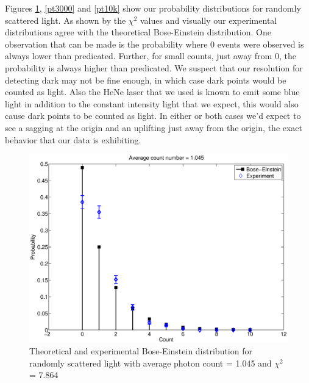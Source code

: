 Figures \ref{pt1000}, \ref{pt3000} and \ref{pt10k} show our probability distributions for randomly scattered light. As shown by the $\chi^{2}$ values and visually our experimental distributions agree with the theoretical Bose-Einstein distribution. One observation that can be made is the probability where 0 events were observed is always lower than predicated. Further, for small counts, just away from 0, the probability is always higher than predicated. We suspect that our resolution for detecting dark may not be fine enough, in which case dark points would be counted as light. Also the HeNe laser that we used is known to emit some blue light in addition to the constant intensity light that we expect, this would also cause dark points to be counted as light. In either or both cases we'd expect to see a sagging at the origin and an uplifting just away from the origin, the exact behavior that our data is exhibiting.

\begin{figure}[H]
  \includegraphics[totalheight=0.6\textwidth]{figs/pt1000}
  \caption{Theoretical and experimental Bose-Einstein distribution for randomly scattered light with average photon count = 1.045 and $\chi^{2}$ = 7.864}
  \label{pt1000}
\end{figure}

